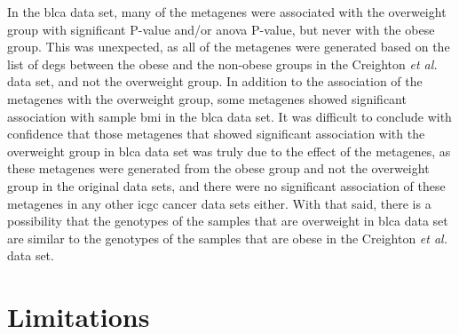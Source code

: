 In the \gls{blca} data set, many of the metagenes were associated with the overweight group with significant P-value and/or \gls{anova} P-value, but never with the obese group.
This was unexpected, as all of the metagenes were generated based on the list of \glspl{deg} between the obese and the non-obese groups in the Creighton \textit{et al.} data set, and not the overweight group.
In addition to the association of the metagenes with the overweight group, some metagenes showed significant association with sample \gls{bmi} in the \gls{blca} data set.
It was difficult to conclude with confidence that those metagenes that showed significant association with the overweight group in \gls{blca} data set was truly due to the effect of the metagenes, as these metagenes were generated from the obese group and not the overweight group in the original data sets,  and there were no significant association of these metagenes in any other \gls{icgc} cancer data sets either.
With that said, there is a possibility that the genotypes of the samples that are overweight in \gls{blca} data set are similar to the genotypes of the samples that are obese in the Creighton \textit{et al.} data set.












































\section{Limitations}
\label{sec:limitations}




